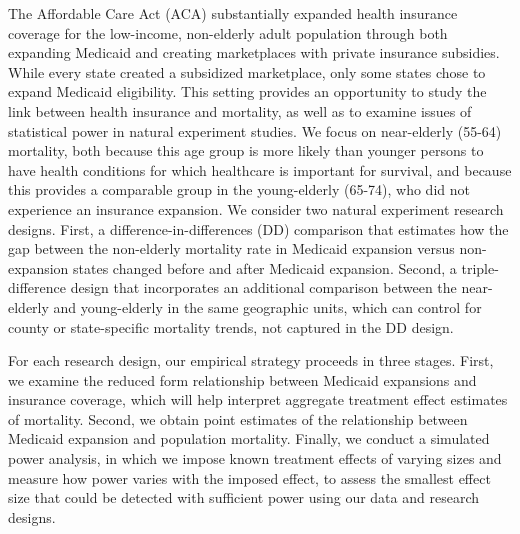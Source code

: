 \documentclass[12pt]{article}%
\begin{document}
The Affordable Care Act (ACA) substantially expanded health insurance coverage for the low-income, non-elderly adult population through both expanding Medicaid and creating marketplaces with private insurance subsidies.  
While every state created a subsidized marketplace, only some states chose to expand Medicaid eligibility.
This setting provides an opportunity to study the link between health insurance and mortality, as well as to examine issues of statistical power in  natural experiment studies. 
We focus on near-elderly (55-64) mortality, both because this age group is more likely than younger persons to have health conditions for which healthcare is important for survival, and because this provides a comparable group in the young-elderly (65-74), who did not experience an insurance expansion. 
We consider two natural experiment research designs.  
First, a difference-in-differences (DD) comparison that estimates how the gap between the non-elderly mortality rate in Medicaid expansion versus non-expansion states changed before and after Medicaid expansion. 
Second, a triple-difference design that incorporates an additional comparison between the near-elderly and young-elderly in the same geographic units, which can control for county or state-specific mortality trends, not captured in the DD design. 


For each research design, our empirical strategy proceeds in three stages. 
First, we examine the reduced form relationship between Medicaid expansions and insurance coverage, which will help interpret aggregate treatment effect estimates of mortality. 
Second, we obtain point estimates of the relationship between Medicaid expansion and population mortality. 
Finally, we conduct a simulated power analysis, in which we impose known treatment effects of varying sizes and measure how power varies with the imposed effect, to assess the smallest effect size that could be detected with sufficient power using our data and research designs.  
\end{document}
